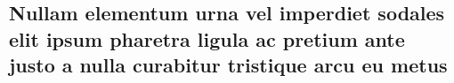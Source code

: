 \documentclass[
article,			%
11pt,				%
oneside,			%
a4paper,			%
english,			%
brazil,				%
sumario=tradicional,
]{abntex2}
\begin{document}
	\lipsum[3]
	
	\postextual
	
	
	
	
	
	\begin{apendicesenv}
		
		\chapter{Nullam elementum urna vel imperdiet sodales elit ipsum pharetra ligula
			ac pretium ante justo
		 a nulla curabitur tristique arcu eu metus}
		\lipsum[55-56]
		
	\end{apendicesenv}
	
\end{document}
